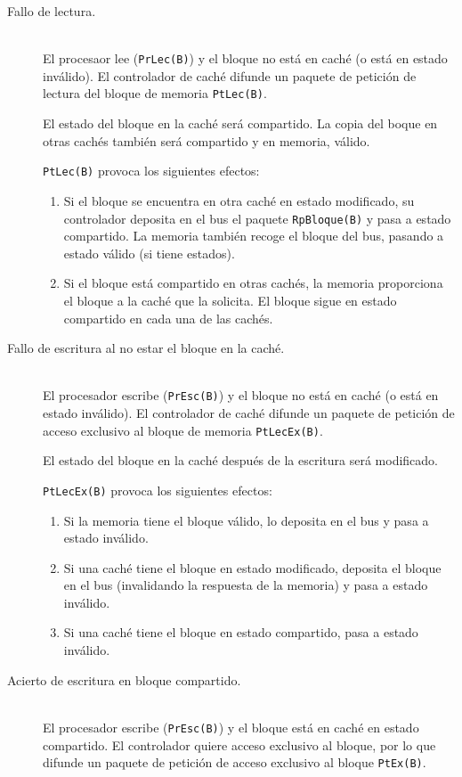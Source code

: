 \begin{description}
    \item [Fallo de lectura.]~\\
    El procesaor lee (\verb|PrLec(B)|) y el bloque no está en caché (o está en estado inválido). El controlador de caché difunde un paquete de petición de lectura del bloque de memoria \verb|PtLec(B)|.

    El estado del bloque en la caché será compartido. La copia del boque en otras cachés también será compartido y en memoria, válido. 

    \verb|PtLec(B)| provoca los siguientes efectos:
    \begin{enumerate}
        \item Si el bloque se encuentra en otra caché en estado modificado, su controlador deposita en el bus el paquete \verb|RpBloque(B)| y pasa a estado compartido. La memoria también recoge el bloque del bus, pasando a estado válido (si tiene estados).
        \item Si el bloque está compartido en otras cachés, la memoria proporciona el bloque a la caché que la solicita. El bloque sigue en estado compartido en cada una de las cachés.
    \end{enumerate}

    \item [Fallo de escritura al no estar el bloque en la caché.]~\\
        El procesador escribe (\verb|PrEsc(B)|) y el bloque no está en caché (o está en estado inválido). El controlador de caché difunde un paquete de petición de acceso exclusivo al bloque de memoria \verb|PtLecEx(B)|. 

    El estado del bloque en la caché después de la escritura será modificado.

    \verb|PtLecEx(B)| provoca los siguientes efectos:
    \begin{enumerate}
        \item Si la memoria tiene el bloque válido, lo deposita en el bus y pasa a estado inválido.
        \item Si una caché tiene el bloque en estado modificado, deposita el bloque en el bus (invalidando la respuesta de la memoria) y pasa a estado inválido.
        \item Si una caché tiene el bloque en estado compartido, pasa a estado inválido.
    \end{enumerate}

    \item [Acierto de escritura en bloque compartido.]~\\
    El procesador escribe (\verb|PrEsc(B)|) y el bloque está en caché en estado compartido. El controlador quiere acceso exclusivo al bloque, por lo que difunde un paquete de petición de acceso exclusivo al bloque \verb|PtEx(B)|.


\end{description}
